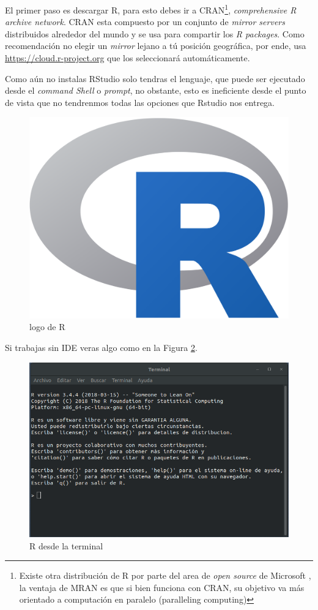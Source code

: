 \documentclass[12pt,]{book}
\begin{document}
El primer paso es descargar R, para esto debes ir a CRAN\footnote{Existe
  otra distribución de R por parte del area de \emph{open source} de
  Microsoft , la ventaja de MRAN es que si bien funciona con CRAN, su
  objetivo va más orientado a computación en paralelo (paralleling
  computing)}, \emph{comprehensive R archive network}. CRAN esta
compuesto por un conjunto de \emph{mirror servers} distribuidos
alrededor del mundo y se usa para compartir los \emph{R packages}. Como
recomendación no elegir un \emph{mirror} lejano a tú posición
geográfica, por ende, usa \url{https://cloud.r-project.org} que los
seleccionará automáticamente.

Como aún no instalas RStudio solo tendras el lenguaje, que puede ser
ejecutado desde el \emph{command Shell} o \emph{prompt}, no obstante,
esto es ineficiente desde el punto de vista que no tendrenmos todas las
opciones que Rstudio nos entrega.

\begin{figure}

{\centering \includegraphics[width=0.333\linewidth]{images/R_logo} 

}

\caption{logo de R}\label{fig:fig1}
\end{figure}

Si trabajas sin IDE veras algo como en la Figura \ref{fig:fig2}.

\begin{figure}

{\centering \includegraphics[width=0.5\linewidth]{images/r_propmt} 

}

\caption{R desde la terminal}\label{fig:fig2}
\end{figure}
\end{document}
